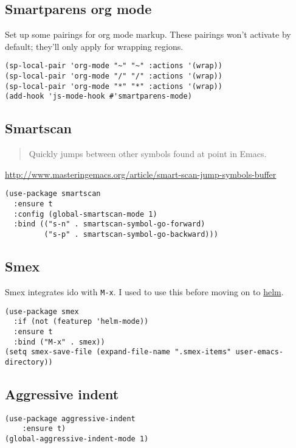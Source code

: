 \documentclass[11pt]{article}
\begin{document}
\subsection{Smartparens org mode}
\label{sec-18-28}

Set up some pairings for org mode markup. These pairings won't
activate by default; they'll only apply for wrapping regions.

\begin{verbatim}
(sp-local-pair 'org-mode "~" "~" :actions '(wrap))
(sp-local-pair 'org-mode "/" "/" :actions '(wrap))
(sp-local-pair 'org-mode "*" "*" :actions '(wrap))
(add-hook 'js-mode-hook #'smartparens-mode)
\end{verbatim}

\subsection{Smartscan}
\label{sec-18-29}

\begin{quote}
Quickly jumps between other symbols found at point in Emacs.
\end{quote}
\url{http://www.masteringemacs.org/article/smart-scan-jump-symbols-buffer}


\begin{verbatim}
(use-package smartscan
  :ensure t
  :config (global-smartscan-mode 1)
  :bind (("s-n" . smartscan-symbol-go-forward)
         ("s-p" . smartscan-symbol-go-backward)))
\end{verbatim}

\subsection{Smex}
\label{sec-18-30}

Smex integrates ido with \verb~M-x~. I used to use this before moving on to
\hyperref[sec-18-9]{helm}.

\begin{verbatim}
(use-package smex
  :if (not (featurep 'helm-mode))
  :ensure t
  :bind ("M-x" . smex))
(setq smex-save-file (expand-file-name ".smex-items" user-emacs-directory))
\end{verbatim}
\subsection{Aggressive indent}
\label{sec-18-31}

\begin{verbatim}
(use-package aggressive-indent
    :ensure t)
(global-aggressive-indent-mode 1)
\end{verbatim}
\end{document}

